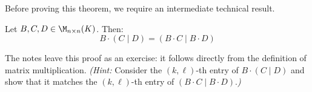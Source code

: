 Before proving this theorem, we require an intermediate technical result.

\begin{lemma}
\label{lemma:block_matrix_multiplication}
Let $B, C, D \in \M_{n \times n}(K)$. Then:
\begin{equation*}
    B \cdot \left(C \mid D\right) = \left(B \cdot C \mid B \cdot D\right)
\end{equation*}
\end{lemma}

\begin{exercise}
\label{exc:block_matrix_multiplication}
The notes leave this proof as an exercise: it follows directly from the definition of matrix multiplication. \textit{(Hint:} Consider the $(k,\ell)$-th entry of $B \cdot (C \mid D)$ and show that it matches the $(k,\ell)$-th entry of $(B \cdot C \mid B \cdot D)$.\textit{)}
\end{exercise}

